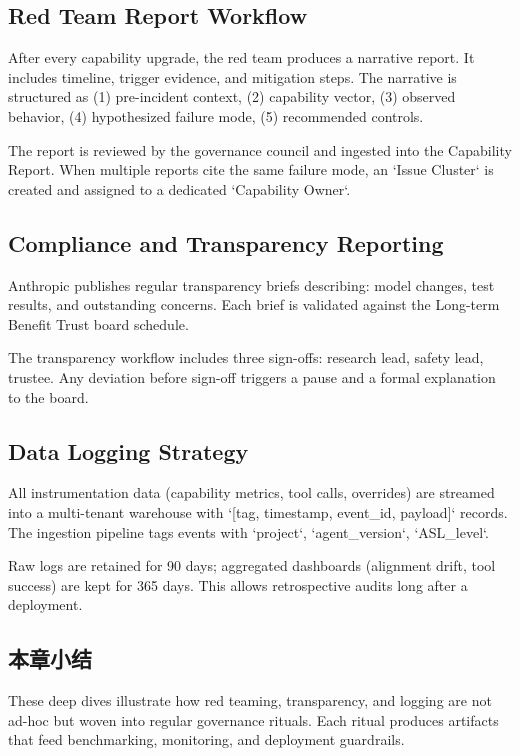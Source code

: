 \documentclass[a4paper]{article}
\begin{document}
\subsection{Red Team Report Workflow}

After every capability upgrade, the red team produces a narrative report. It includes timeline, trigger evidence, and mitigation steps. The narrative is structured as (1) pre-incident context, (2) capability vector, (3) observed behavior, (4) hypothesized failure mode, (5) recommended controls.

The report is reviewed by the governance council and ingested into the Capability Report. When multiple reports cite the same failure mode, an `Issue Cluster` is created and assigned to a dedicated `Capability Owner`.

\subsection{Compliance and Transparency Reporting}

Anthropic publishes regular transparency briefs describing: model changes, test results, and outstanding concerns. Each brief is validated against the Long-term Benefit Trust board schedule.

The transparency workflow includes three sign-offs: research lead, safety lead, trustee. Any deviation before sign-off triggers a pause and a formal explanation to the board.

\subsection{Data Logging Strategy}

All instrumentation data (capability metrics, tool calls, overrides) are streamed into a multi-tenant warehouse with `[tag, timestamp, event\_id, payload]` records. The ingestion pipeline tags events with `project`, `agent\_version`, `ASL\_level`.

Raw logs are retained for 90 days; aggregated dashboards (alignment drift, tool success) are kept for 365 days. This allows retrospective audits long after a deployment.

\subsection{本章小结}

These deep dives illustrate how red teaming, transparency, and logging are not ad-hoc but woven into regular governance rituals. Each ritual produces artifacts that feed benchmarking, monitoring, and deployment guardrails.
\end{document}

